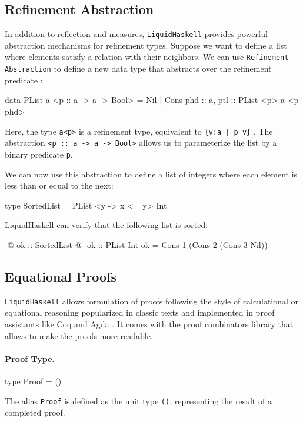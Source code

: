 \subsection{Refinement Abstraction}
In addition to reflection and measures, \texttt{LiquidHaskell} provides powerful abstraction mechanisms for refinement types.
Suppose we want to define a list where elements satisfy a relation with their neighbors.
We can use \texttt{Refinement Abstraction} to define a new data type that abstracts over the refinement predicate \cite{vazou_liquidhaskell_2014}:

\begin{code}
	data PList a <p :: a -> a -> Bool> =
	Nil
	| Cons { phd :: a, ptl :: PList <p> a <p phd> }
\end{code}

Here, the type \texttt{a<p>} is a refinement type, equivalent to \texttt{\{v:a | p\ v\}} .
The abstraction \texttt{<p :: a -> a -> Bool>} allows us to parameterize the list by a binary predicate \texttt{p}.

We can now use this abstraction to define a list of integers where each element is less than or equal to the next:

\begin{code}
	type SortedList = PList <{\x y -> x <= y}> Int
\end{code}

LiquidHaskell can verify that the following list is sorted:

\begin{code}
	{-@ ok :: SortedList @-}
	ok :: PList Int
	ok = Cons 1 (Cons 2 (Cons 3 Nil))
\end{code}


\subsection{Equational Proofs}
\texttt{LiquidHaskell} allows formulation of proofs following the style of calculational or equational reasoning popularized in classic texts
and implemented in proof assistants like Coq and Agda \cite{vazou2018}.
It comes with the proof combinators library that allows to make the proofs more readable.

\paragraph{Proof Type.}
\begin{code}[label={lst:proof-type}]
	type Proof = ()
\end{code}
The alias \texttt{Proof} is defined as the unit type \texttt{()}, representing the result of a completed proof.

